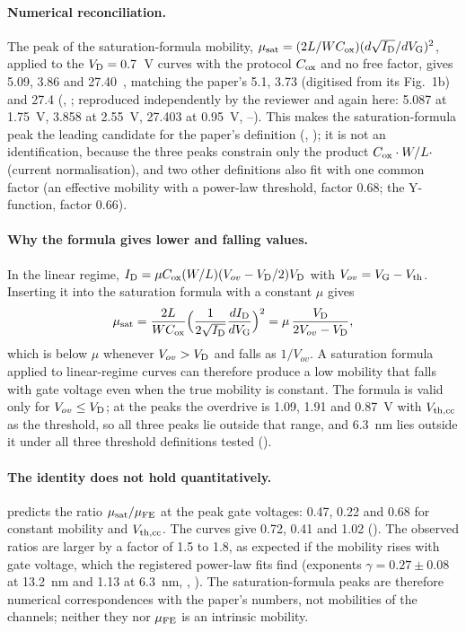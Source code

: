 \paragraph{Numerical reconciliation.} The peak of the saturation-formula mobility,
$\mu_{\mathrm{sat}} = (2L/WC_{\mathrm{ox}})(d\sqrt{I_{\mathrm{D}}}/dV_{\mathrm{G}})^2$, applied to the $V_{\mathrm{D}} = 0.7$~V curves with the protocol $C_{\mathrm{ox}}$ and no free
factor, gives 5.09, 3.86 and 27.40~\cmVs{}, matching the paper's 5.1, 3.73 (digitised from its Fig.~1b) and 27.4
(, ; reproduced independently by the reviewer and again here: 5.087 at 1.75~V, 3.858 at
2.55~V, 27.403 at 0.95~V, --). This makes the saturation-formula peak the leading candidate for the
paper's definition (, ); it is not an identification, because the three peaks constrain only
the product $C_{\mathrm{ox}}\cdot W/L\cdot$(current normalisation), and two other definitions also fit with one common factor
(an effective mobility with a power-law threshold, factor 0.68; the Y-function, factor 0.66).

\paragraph{Why the formula gives lower and falling values.} In the linear regime, $I_{\mathrm{D}} = \mu C_{\mathrm{ox}}(W/L)(V_{ov} -
V_{\mathrm{D}}/2)V_{\mathrm{D}}$ with $V_{ov} = V_{\mathrm{G}} - V_{\mathrm{th}}$. Inserting it into the saturation formula with a constant $\mu$ gives
\begin{equation}
\mu_{\mathrm{sat}} = \frac{2L}{WC_{\mathrm{ox}}}\Big(\frac{1}{2\sqrt{I_{\mathrm{D}}}}\frac{dI_{\mathrm{D}}}{dV_{\mathrm{G}}}\Big)^2 = \mu\,\frac{V_{\mathrm{D}}}{2V_{ov}-V_{\mathrm{D}}} ,
\label{eq:mono-prov-musat}
\end{equation}
which is below $\mu$ whenever $V_{ov} > V_{\mathrm{D}}$ and falls as $1/V_{ov}$. A saturation formula applied to linear-regime
curves can therefore produce a low mobility that falls with gate voltage even when the true mobility is constant. The
formula is valid only for $V_{ov} \le V_{\mathrm{D}}$; at the peaks the overdrive is 1.09, 1.91 and 0.87~V with $V_{\mathrm{th,cc}}$ as the
threshold, so all three peaks lie outside that range, and 6.3~nm lies outside it under all three threshold definitions
tested ().

\paragraph{The identity does not hold quantitatively.}  predicts the ratio $\mu_{\mathrm{sat}}/\mu_{\mathrm{FE}}$ at
the peak gate voltages: 0.47, 0.22 and 0.68 for constant mobility and $V_{\mathrm{th,cc}}$. The curves give 0.72, 0.41 and 1.02
(). The observed ratios are larger by a factor of 1.5 to 1.8, as expected if the
mobility rises with gate voltage, which the registered power-law fits find (exponents $\gamma = 0.27\pm0.08$ at 13.2~nm
and 1.13 at 6.3~nm, , ). The saturation-formula peaks are therefore numerical correspondences
with the paper's numbers, not mobilities of the channels; neither they nor $\mu_{\mathrm{FE}}$ is an intrinsic mobility.


